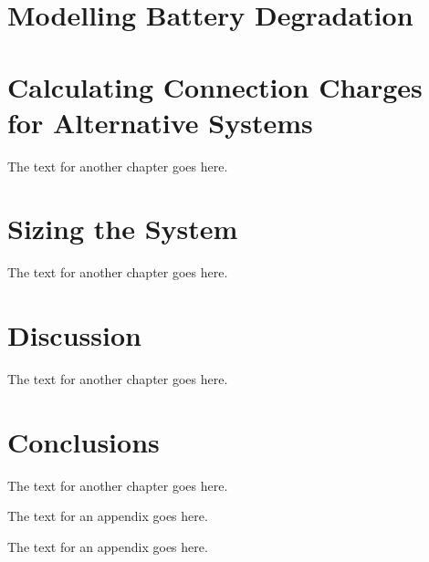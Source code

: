 \documentclass[a4paper]{18monthreport}
\begin{document}
\chapter{Modelling Battery Degradation}
\label{sec:Modelling Battery Degradation}


\chapter{Calculating Connection Charges for Alternative Systems}
\label{sec:Calculating Connection Charges for Alternative Systems}
The text for another chapter goes here.

\chapter{Sizing the System}
\label{sec:Sizing the System}
The text for another chapter goes here.

\chapter{Discussion}
\label{sec:Discussion}
The text for another chapter goes here.

\chapter{Conclusions}
\label{sec:Conclusions}
The text for another chapter goes here.


\appendix{}
The text for an appendix goes here.

\appendix{}
The text for an appendix goes here.

\backmatter
{}

\end{document}
